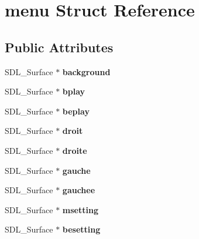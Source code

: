 \hypertarget{structmenu}{}\section{menu Struct Reference}
\label{structmenu}
\subsection*{Public Attributes}
\begin{DoxyCompactItemize}
\item 
\mbox{\label{structmenu_a7044d0a9c1f19838dcce7f6329db266b}} 
S\+D\+L\+\_\+\+Surface $\ast$ {\bfseries background}
\item 
\mbox{\label{structmenu_a1a613023f41a649fcf467fc905c4c9f4}} 
S\+D\+L\+\_\+\+Surface $\ast$ {\bfseries bplay}
\item 
\mbox{\label{structmenu_a9b117673e993b4f4ec460faa3f0255d5}} 
S\+D\+L\+\_\+\+Surface $\ast$ {\bfseries beplay}
\item 
\mbox{\label{structmenu_a1f75428c174f27c91b0a6a7aef54d148}} 
S\+D\+L\+\_\+\+Surface $\ast$ {\bfseries droit}
\item 
\mbox{\label{structmenu_a288311a617323980df856568fc9dcaac}} 
S\+D\+L\+\_\+\+Surface $\ast$ {\bfseries droite}
\item 
\mbox{\label{structmenu_a0c9672dab238b7ed000233e824d53b6f}} 
S\+D\+L\+\_\+\+Surface $\ast$ {\bfseries gauche}
\item 
\mbox{\label{structmenu_a36420031d68e23a6cd2768d5869abcb0}} 
S\+D\+L\+\_\+\+Surface $\ast$ {\bfseries gauchee}
\item 
\mbox{\label{structmenu_a382ad761d4b680ad604873079094ec69}} 
S\+D\+L\+\_\+\+Surface $\ast$ {\bfseries msetting}
\item 
\mbox{\label{structmenu_ab50ff40ae4143d45b383405515f9d053}} 
S\+D\+L\+\_\+\+Surface $\ast$ {\bfseries besetting}
\item 
\mbox{\label{structmenu_a680dce2e8de958fa7f28d57f7582185b}} 

\end{DoxyCompactItemize}
